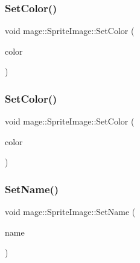 \hypertarget{classmage_1_1_sprite_image_a3f4ef2e0a24c2e9deeb6827bf438ae21}{}\label{classmage_1_1_sprite_image_a3f4ef2e0a24c2e9deeb6827bf438ae21} 
\subsubsection{\texorpdfstring{Set\+Color()}{SetColor()}\hspace{0.1cm}{\footnotesize\ttfamily [1/2]}}
{\footnotesize\ttfamily void mage\+::\+Sprite\+Image\+::\+Set\+Color (\begin{DoxyParamCaption}\item[{const \hyperlink{structmage_1_1_color}{Color} \&}]{color }\end{DoxyParamCaption})}

\hypertarget{classmage_1_1_sprite_image_a936547b1852b2249f03c3187bc354ee8}{}\label{classmage_1_1_sprite_image_a936547b1852b2249f03c3187bc354ee8} 
\subsubsection{\texorpdfstring{Set\+Color()}{SetColor()}\hspace{0.1cm}{\footnotesize\ttfamily [2/2]}}
{\footnotesize\ttfamily void mage\+::\+Sprite\+Image\+::\+Set\+Color (\begin{DoxyParamCaption}\item[{const X\+M\+V\+E\+C\+T\+OR \&}]{color }\end{DoxyParamCaption})}

\hypertarget{classmage_1_1_sprite_image_a86416c5cdc54d90d7ffa08f8b00dc254}{}\label{classmage_1_1_sprite_image_a86416c5cdc54d90d7ffa08f8b00dc254} 
\subsubsection{\texorpdfstring{Set\+Name()}{SetName()}}
{\footnotesize\ttfamily void mage\+::\+Sprite\+Image\+::\+Set\+Name (\begin{DoxyParamCaption}\item[{const string \&}]{name }\end{DoxyParamCaption})}

